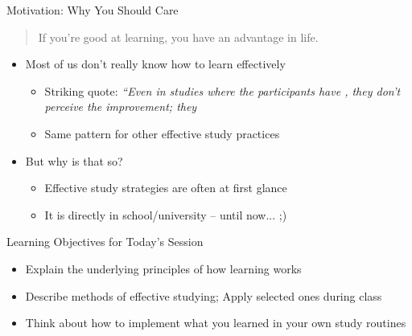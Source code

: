 \documentclass{ercisbeamer}
\begin{document}
\begin{frame}{Motivation: Why You Should Care}
    \begin{quote}
    If you're good at learning, you have an advantage in life. 
    \end{quote}
    \vspace{1em}
    \begin{itemize}
        \item Most of us don't really know how to learn effectively
        \begin{itemize}
            \item Striking quote: \emph{``Even in studies where the participants have , they don't perceive the improvement; they  }
            \item Same pattern for other effective study practices
        \end{itemize}
        \item But why is that so?
        \begin{itemize}
            \item Effective study strategies are often  at first glance
            \item It is  directly  in school/university -- until now... ;)
        \end{itemize}
    \end{itemize}
\end{frame}

\begin{frame}{Learning Objectives for Today's Session}
    \begin{itemize}
        \item Explain the underlying principles of how learning works
        \item Describe methods of effective studying; Apply selected ones during class
        \item Think about how to implement what you learned in your own study routines
    \end{itemize}
\end{frame}
\end{document}
